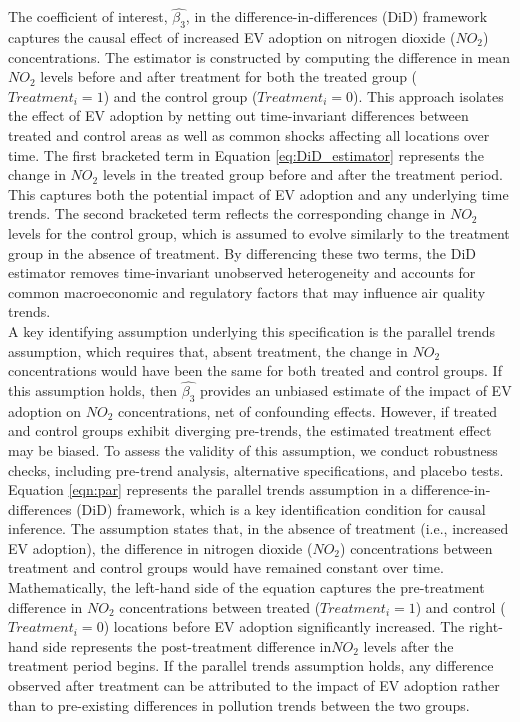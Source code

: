 \documentclass[12pt]{article}
\newcommand\tab[1][.50cm]{\hspace*{#1}}
\begin{document}
\begin{multicols}{2}
		The coefficient of interest, $\hat{\beta_3}$, in the difference-in-differences (DiD) framework captures the causal effect of increased EV adoption on nitrogen dioxide ($NO_2$) concentrations. The estimator is constructed by computing the difference in mean $NO_2$ levels before and after treatment for both the treated group ($Treatment_i = 1$) and the control group ($Treatment_i = 0$). This approach isolates the effect of EV adoption by netting out time-invariant differences between treated and control areas as well as common shocks affecting all locations over time. The first bracketed term in Equation \eqref{eq:DiD_estimator} represents the change in $NO_2$ levels in the treated group before and after the treatment period. This captures both the potential impact of EV adoption and any underlying time trends. The second bracketed term reflects the corresponding change in $NO_2$ levels for the control group, which is assumed to evolve similarly to the treatment group in the absence of treatment. By differencing these two terms, the DiD estimator removes time-invariant unobserved heterogeneity and accounts for common macroeconomic and regulatory factors that may influence air quality trends.\\
		\tab A key identifying assumption underlying this specification is the parallel trends assumption, which requires that, absent treatment, the change in $NO_2$ concentrations would have been the same for both treated and control groups. If this assumption holds, then  $\hat{\beta_3}$ provides an unbiased estimate of the impact of EV adoption on $NO_2$ concentrations, net of confounding effects. However, if treated and control groups exhibit diverging pre-trends, the estimated treatment effect may be biased. To assess the validity of this assumption, we conduct robustness checks, including pre-trend analysis, alternative specifications, and placebo tests.\\
		\tab Equation \eqref{eqn:par} represents the parallel trends assumption in a difference-in-differences (DiD) framework, which is a key identification condition for causal inference. The assumption states that, in the absence of treatment (i.e., increased EV adoption), the difference in nitrogen dioxide ($NO_2$) concentrations between treatment and control groups would have remained constant over time.\\
		\tab Mathematically, the left-hand side of the equation captures the pre-treatment difference in $NO_2$ concentrations between treated ($Treatment_i = 1 $) and control ($Treatment_i = 0$) locations before EV adoption significantly increased. The right-hand side represents the post-treatment difference in$NO_2$ levels after the treatment period begins. If the parallel trends assumption holds, any difference observed after treatment can be attributed to the impact of EV adoption rather than to pre-existing differences in pollution trends between the two groups.\\

\end{multicols}
\end{document}
